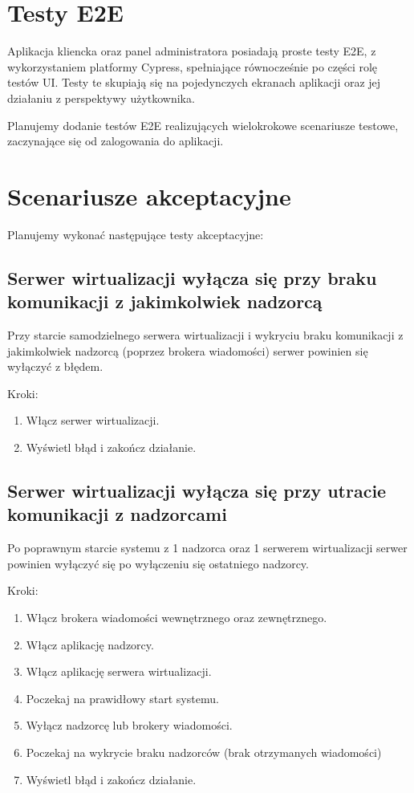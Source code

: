 \documentclass[12pt]{article}
\begin{document}
\section{Testy E2E}
Aplikacja kliencka oraz panel administratora posiadają proste testy E2E, z wykorzystaniem platformy Cypress, spełniające równocześnie po części rolę testów UI. Testy te skupiają się na pojedynczych ekranach aplikacji oraz jej działaniu z perspektywy użytkownika.

Planujemy dodanie testów E2E realizujących wielokrokowe scenariusze testowe, zaczynające się od zalogowania do aplikacji.

\section{Scenariusze akceptacyjne}
Planujemy wykonać następujące testy akceptacyjne:

\subsection {Serwer wirtualizacji wyłącza się przy braku komunikacji z jakimkolwiek nadzorcą}
Przy starcie samodzielnego serwera wirtualizacji i wykryciu braku komunikacji z jakimkolwiek nadzorcą (poprzez brokera wiadomości) serwer powinien się wyłączyć z błędem.

Kroki:
\begin{enumerate}
	\item Włącz serwer wirtualizacji.
	\item Wyświetl błąd i zakończ działanie.
\end{enumerate}

\subsection {Serwer wirtualizacji wyłącza się przy utracie komunikacji z nadzorcami}
Po poprawnym starcie systemu z 1 nadzorca oraz 1 serwerem wirtualizacji serwer powinien wyłączyć się po wyłączeniu się ostatniego nadzorcy.

Kroki:
\begin{enumerate}
	\item Włącz brokera wiadomości wewnętrznego oraz zewnętrznego.
	\item Włącz aplikację nadzorcy.
	\item Włącz aplikację serwera wirtualizacji.
	\item Poczekaj na prawidłowy start systemu.
	\item Wyłącz nadzorcę lub brokery wiadomości.
	\item Poczekaj na wykrycie braku nadzorców (brak otrzymanych wiadomości)
	\item Wyświetl błąd i zakończ działanie.
\end{enumerate}
\end{document}
